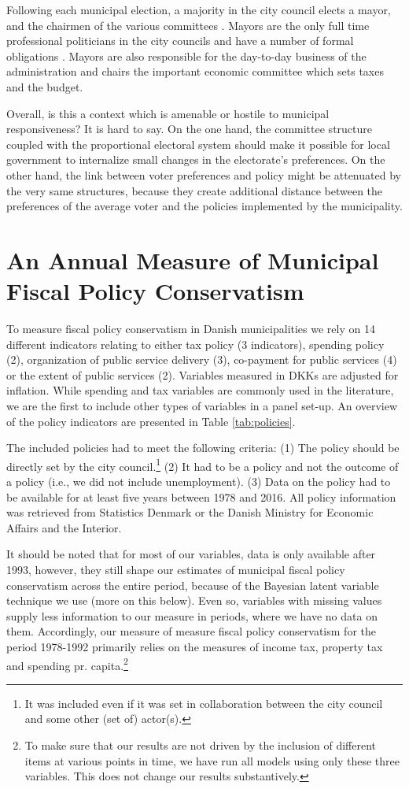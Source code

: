\documentclass[a4paper,12pt]{article}
\begin{document}
Following each municipal election, a majority in the city council elects a mayor, and the chairmen of the various committees \citep{serritzlew2008explaining}. Mayors are the only full time professional politicians in the city councils and have a number of formal obligations \citep{kjaer2015urban}. Mayors are also responsible for the day-to-day business of the administration and chairs the important economic committee which sets taxes and the budget.

Overall, is this a context which is amenable or hostile to municipal responsiveness? It is hard to say. On the one hand, the committee structure coupled with the proportional electoral system should make it possible for local government to internalize small changes in the electorate's preferences. On the other hand, the link between voter preferences and policy might be attenuated by the very same structures, because they create additional distance between the preferences of the average voter and the policies implemented by the municipality.

\section{An Annual Measure of Municipal Fiscal Policy Conservatism}
To measure fiscal policy conservatism in Danish municipalities we rely on 14 different indicators relating to either tax policy (3 indicators), spending policy (2), organization of public service delivery (3), co-payment for public services (4) or the extent of public services (2). Variables measured in DKKs are adjusted for inflation. While  spending and tax variables are commonly used in the literature, we are the first to include other types of variables in a panel set-up. An overview of the policy indicators are presented in Table \ref{tab:policies}.

The included policies had to meet the following criteria: (1) The policy should be directly set by the city council.\footnote{It was included even if it was set in collaboration between the city council and some other (set of) actor(s).} (2) It had to be a policy and not the outcome of a policy (i.e., we did not include unemployment). (3) Data on the policy had to be available for at least five years between 1978 and 2016. All policy information was retrieved from Statistics Denmark or the Danish Ministry for Economic Affairs and the Interior.

It should be noted that for most of our variables, data is only available after 1993, however, they still shape our estimates of municipal fiscal policy conservatism across the entire period, because of the Bayesian latent variable technique we use (more on this below). Even so, variables with missing values supply less information to our measure in periods, where we have no data on them. Accordingly, our measure of measure fiscal policy conservatism for the period 1978-1992 primarily relies on the measures of income tax, property tax and spending pr. capita.\footnote{To make sure that our results are not driven by the inclusion of different items at various points in time, we have run all models using only these three variables. This does not change our results substantively.}
\end{document}
